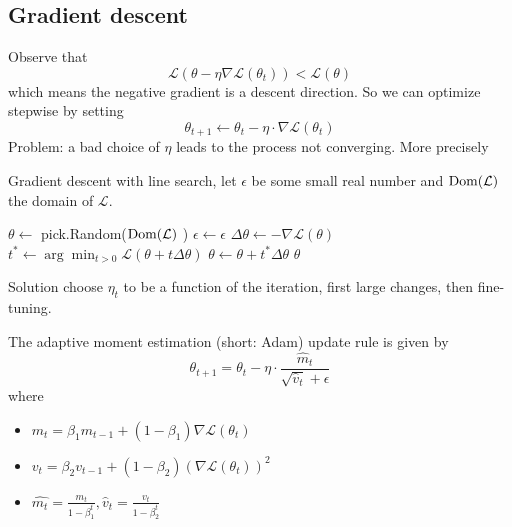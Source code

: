 \documentclass[12 pt]{article}        	%
\begin{document}
\subsection{Gradient descent}

Observe that 
\[
    \mathcal{ L } ( \theta - \eta \nabla \mathcal{ L } ( \theta_t ) ) < \mathcal{ L }( \theta ) 
\]
which means the negative gradient is a descent direction.
So we can optimize stepwise by setting
\[
    \theta_{ t + 1 } \leftarrow \theta_t - \eta \cdot \nabla \mathcal{ L } ( \theta_t )
\]
Problem: a bad choice of $ \eta $ leads to the process not converging.
More precisely
\begin{algo}
    Gradient descent with line search, let $ \epsilon $ be some small real number and $ \operatorname{Dom} ( \mathcal{ L } ) $ the domain of $ \mathcal{ L } $.
    \begin{algorithm}
        \State $ \theta \gets $ pick.Random($\operatorname{Dom} ( \mathcal{ L } ) $ ) 
        \State $ \epsilon \gets \epsilon $
                \State $ \Delta \theta \gets - \nabla \mathcal{ L } ( \theta ) $
                \State $ t^* \gets \arg \min_{ t> 0 } \mathcal{ L } ( \theta + t \Delta \theta ) $ 
                \State $ \theta \gets \theta + t^* \Delta \theta $ 
            \EndWhile
        \State \Return{ }$ \theta $ 
    \end{algorithm}
\end{algo}
Solution choose $ \eta_t $ to be a function of the iteration, first large changes, then fine-tuning.

\begin{defi}
    The adaptive moment estimation (short: Adam) update rule is given by
    \[
        \theta_{ t + 1 } = \theta_t - \eta \cdot \frac{ \hat{ m }_t }{ \sqrt{ \hat{ v }_t } + \epsilon }
    \]
    where 
    \begin{itemize}
        \item 
        $ m_t = \beta_1 m_{ t - 1 } + ( 1 - \beta_1 ) \nabla \mathcal{ L } ( \theta_t ) $

        \item 
        $ v_t = \beta_2 v_{ t - 1 } + ( 1 - \beta_2 ) ( \nabla \mathcal{ L } ( \theta_t ) )^2 $

        \item 
        $ \hat{ m_t } = \frac{ m_t }{ 1 - \beta_1^t } , \hat{ v }_t = \frac{ v_t }{ 1 - \beta_2^t }$
    \end{itemize}
\end{defi}
\end{document}
